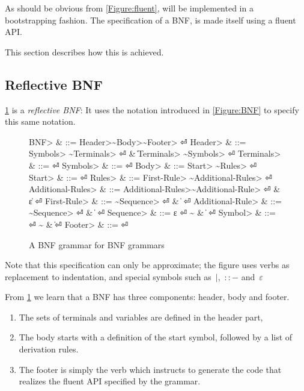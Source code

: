 As should be obvious from \cref{Figure:fluent}, \Self will be implemented
  in a bootstrapping fashion.
The specification of a BNF, is made itself using a fluent API.


This section describes how this is achieved.

\subsection{Reflective BNF}
\cref{Figure:BNF:BNF} is a \emph{reflective BNF}:
It uses the notation introduced in \cref{Figure:BNF}
  to specify this same notation.


\begin{figure}[H]
  \begin{Grammar}
    \begin{aligned}
      \<BNF> & ::= \<Header>\~\<Body>\~\<Footer> \hfill⏎
      \<Header> & ::= \<Symbols> \~\<Terminals> \hfill⏎
      {} & \| \<Terminals> \~\<Symbols> \hfill⏎
      \<Terminals> & ::= \hfill⏎
      \<Symbols> & ::= \hfill⏎
      \<Body> & ::= \<Start> \~\<Rules> \hfill⏎
      \<Start> & ::=  \hfill⏎
      \<Rules> & ::= \<First-Rule> \~\<Additional-Rules> \hfill⏎
      \<Additional-Rules> & ::= \<Additional-Rules>\~\<Additional-Rule> \hfill⏎
      {} & \| ε \hfill⏎
      \<First-Rule> & ::= \~\<Sequence> \hfill⏎
      {} & \|  \hfill⏎
      \<Additional-Rule> & ::= \~\<Sequence> \hfill⏎
      {} & \|  \hfill⏎
      \<Sequence> & ::= ε \hfill⏎
      {\~} & \|  \hfill⏎
      \<Symbol> & ::=  \hfill⏎
      {\~} & \| \hfill⏎
      \<Footer> & ::= \hfill⏎
    \end{aligned}
  \end{Grammar}
  \caption{A BNF grammar for BNF grammars}
  \label{Figure:BNF:BNF}
\end{figure}

Note that this specification can only be approximate;
  the figure uses verbs as replacement to indentation,
  and special symbols such as~$|$,~$::-$ and~$ε$

From \cref{Figure:BNF:BNF} we learn 
  that a BNF has three components: header, body and footer.
  \begin{enumerate}
    \item The sets of terminals and variables are defined in the header part, 
    \item The body starts with a definition of the start symbol, followed by a list of derivation
  rules. 
\item The footer is simply the verb  which instructs \Self
  to generate the code that realizes the fluent API specified by the grammar.
  \end{enumerate}

